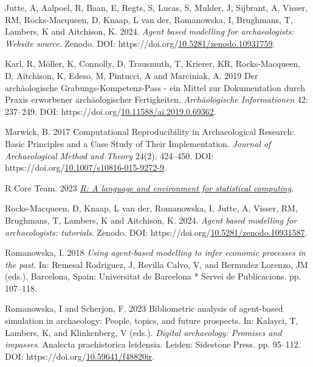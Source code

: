 \documentclass[
]{article}
\newlength{\cslhangindent}
\newlength{\cslentryspacingunit} %
\newenvironment{CSLReferences}[2] %
 {%
  \setlength{\parindent}{0pt}
  \ifodd #1
  \let\oldpar\par
  \def\par{\hangindent=\cslhangindent\oldpar}
  \fi
  \setlength{\parskip}{#2\cslentryspacingunit}
 }%
 {}
\begin{document}
\begin{CSLReferences}{1}{0}
\leavevmode{}%
Jutte, A, Aalpoel, R, Baan, E, Regts, S, Lucas, S, Mulder, J, Sijbrant, A, Visser, RM, Rocks-Macqueen, D, Knaap, L van der, Romanowska, I, Brughmans, T, Lambers, K and Aitchison, K. 2024. \emph{Agent based modelling for archaeologists: Website source}. Zenodo. DOI: https://doi.org/\href{https://doi.org/10.5281/zenodo.10931759}{10.5281/zenodo.10931759}.

\leavevmode{}%
Karl, R, Möller, K, Connolly, D, Trausmuth, T, Krierer, KR, Rocks-Macqueen, D, Aitchison, K, Edeso, M, Pintucci, A and Marciniak, A. 2019 Der archäologische Grabungs-Kompetenz-Pass - ein Mittel zur Dokumentation durch Praxis erworbener archäologischer Fertigkeiten. \emph{Archäologische Informationen} 42: 237--249. DOI: https://doi.org/\href{https://doi.org/10.11588/ai.2019.0.69362}{10.11588/ai.2019.0.69362}.

\leavevmode{}%
Marwick, B. 2017 Computational Reproducibility in Archaeological Research: Basic Principles and a Case Study of Their Implementation. \emph{Journal of Archaeological Method and Theory} 24(2): 424--450. DOI: https://doi.org/\href{https://doi.org/10.1007/s10816-015-9272-9}{10.1007/s10816-015-9272-9}.

\leavevmode{}%
R Core Team. 2023 \emph{\href{https://www.R-project.org/}{R: A language and environment for statistical computing}}.

\leavevmode{}%
Rocks-Macqueen, D, Knaap, L van der, Romanowska, I, Jutte, A, Visser, RM, Brughmans, T, Lambers, K and Aitchison, K. 2024. \emph{Agent based modelling for archaeologists: tutorials}. Zenodo. DOI: https://doi.org/\href{https://doi.org/10.5281/zenodo.10931587}{10.5281/zenodo.10931587}.

\leavevmode{}%
Romanowska, I. 2018 \emph{Using agent-based modelling to infer economic processes in the past}. In: Remesal Rodriguez, J, Revilla Calvo, V, and Bermudez Lorenzo, JM (eds.). Barcelona, Spain: Universitat de Barcelona * Servei de Publicacions. pp. 107--118.

\leavevmode{}%
Romanowska, I and Scherjon, F. 2023 Bibliometric analysis of agent-based simulation in archaeology: People, topics, and future prospects. In: Kalayci, T, Lambers, K, and Klinkenberg, V (eds.). \emph{Digital archaeology: Promises and impasses}. Analecta praehistorica leidensia. Leiden: Sidestone Press. pp. 95--112. DOI: https://doi.org/\href{https://doi.org/10.59641/f48820ir}{10.59641/f48820ir}.


\end{CSLReferences}
\end{document}
